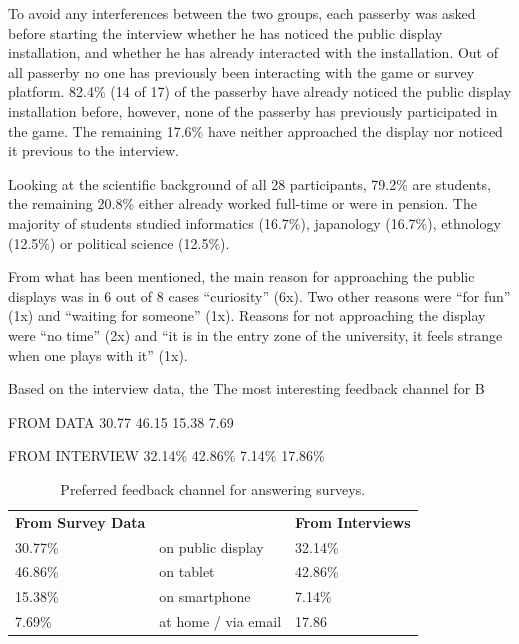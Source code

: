To avoid any interferences between the two groups, each passerby was asked before starting the interview whether he has noticed the public display installation, and whether he has already interacted with the installation. Out of all passerby no one has previously been interacting with the game or survey platform. 82.4\% (14 of 17) of the passerby have already noticed the public display installation before, however, none of the passerby has previously participated in the game. The remaining 17.6\% have neither approached the display nor noticed it previous to the interview. 

Looking at the scientific background of all 28 participants, 79.2\% are students, the remaining 20.8\% either already worked full-time or were in pension. The majority of students studied informatics (16.7\%), japanology (16.7\%), ethnology (12.5\%) or political science (12.5\%).

From what has been mentioned, the main reason for approaching the public displays was in 6 out of 8 cases ``curiosity'' (6x). Two other reasons were ``for fun'' (1x) and ``waiting for someone'' (1x). Reasons for not approaching the display were ``no time'' (2x) and ``it is in the entry zone of the university, it feels strange when one plays with it'' (1x).

Based on the interview data, the 
The most interesting feedback channel for 
B 


FROM DATA
30.77%
46.15%
15.38%
7.69%

FROM INTERVIEW
32.14\%
42.86\%
7.14\%
17.86\%






\begin{table}[h]
\center
\begin{tabular}{lllll}
\multicolumn{2}{l}{\textbf{From Survey Data}} &  & \multicolumn{2}{l}{\textbf{From Interviews}} \\
30.77\%                   & \multicolumn{3}{l}{on public display}    & 32.14\%                  \\
46.86\%                   & \multicolumn{3}{l}{on tablet}            & 42.86\%                  \\
15.38\%                   & \multicolumn{3}{l}{on smartphone}        & 7.14\%                   \\
7.69\%                    & \multicolumn{3}{l}{at home / via email}  & 17.86                   
\end{tabular}
\caption[Feedback Channel]{Preferred feedback channel for answering surveys.}
\end{table}



